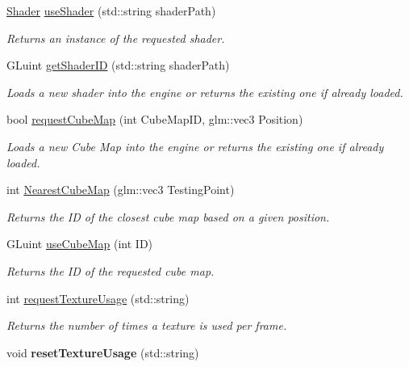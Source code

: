 \begin{DoxyCompactItemize}
\item 
\hyperlink{class_shader}{Shader} \hyperlink{class_resource_manager_a8c5654dad152328ad50a20f130464acf}{use\+Shader} (std\+::string shader\+Path)
\begin{DoxyCompactList}\small\item\em Returns an instance of the requested shader. \end{DoxyCompactList}\item 
G\+Luint \hyperlink{class_resource_manager_a63f9e674e29969a32cb4ea906e9a5aa4}{get\+Shader\+ID} (std\+::string shader\+Path)
\begin{DoxyCompactList}\small\item\em Loads a new shader into the engine or returns the existing one if already loaded. \end{DoxyCompactList}\item 
bool \hyperlink{class_resource_manager_aaa351ca8ae3ef95f4089398dc288552f}{request\+Cube\+Map} (int Cube\+Map\+ID, glm\+::vec3 Position)
\begin{DoxyCompactList}\small\item\em Loads a new Cube Map into the engine or returns the existing one if already loaded. \end{DoxyCompactList}\item 
int \hyperlink{class_resource_manager_ac1552bad163f9c3727faadaa9b055406}{Nearest\+Cube\+Map} (glm\+::vec3 Testing\+Point)
\begin{DoxyCompactList}\small\item\em Returns the ID of the closest cube map based on a given position. \end{DoxyCompactList}\item 
G\+Luint \hyperlink{class_resource_manager_a07e56b885469a090c43606a13e451d62}{use\+Cube\+Map} (int ID)
\begin{DoxyCompactList}\small\item\em Returns the ID of the requested cube map. \end{DoxyCompactList}\item 
int \hyperlink{class_resource_manager_a1438d6e497c7456e4f875c5936f898d5}{request\+Texture\+Usage} (std\+::string)
\begin{DoxyCompactList}\small\item\em Returns the number of times a texture is used per frame. \end{DoxyCompactList}\item 
void {\bfseries reset\+Texture\+Usage} (std\+::string)\hypertarget{class_resource_manager_aa78d80ebfe3deec7e98362f7eff29b3b}{}\label{class_resource_manager_aa78d80ebfe3deec7e98362f7eff29b3b}


\end{DoxyCompactItemize}

